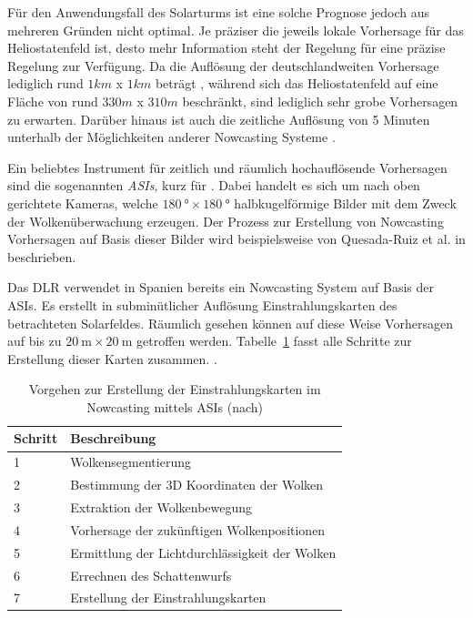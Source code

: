 Für den Anwendungsfall des Solarturms ist eine solche Prognose jedoch aus mehreren Gründen nicht optimal.
Je präziser die jeweils lokale Vorhersage für das Heliostatenfeld ist, desto mehr Information steht der Regelung für eine präzise Regelung zur Verfügung.
Da die Auflösung der deutschlandweiten Vorhersage lediglich rund $1km$ x $1km$ beträgt \cite{DWD1}\cite{DWD2}, während sich das Heliostatenfeld auf eine Fläche von rund $330m$ x $310m$ beschränkt, sind lediglich sehr grobe Vorhersagen zu erwarten.
Darüber hinaus ist auch die zeitliche Auflösung von 5 Minuten \cite{DWD2} unterhalb der Möglichkeiten anderer Nowcasting Systeme \cite{DLRNowcasting}\cite[S.272]{QuesadaRuiz}.

Ein beliebtes Instrument für zeitlich und räumlich hochauflösende Vorhersagen sind die sogenannten \textit{ASIs}, kurz für .
Dabei handelt es sich um nach oben gerichtete Kameras, welche $\SI{180}{\degree} \times \SI{180}{\degree}$ halbkugelförmige Bilder mit dem Zweck der Wolkenüberwachung erzeugen.
Der Prozess zur Erstellung von Nowcasting Vorhersagen auf Basis dieser Bilder wird beispielsweise von Quesada-Ruiz et al. in \cite{QuesadaRuiz} beschrieben. \cite{Samu}

Das DLR verwendet in Spanien bereits ein Nowcasting System auf Basis der ASIs.
Es erstellt in subminütlicher Auflösung Einstrahlungskarten des betrachteten Solarfeldes.
Räumlich gesehen können auf diese Weise Vorhersagen auf bis zu $\SI{20}{\metre} \times \SI{20}{\metre}$ getroffen werden.
Tabelle~\ref{tab_VorgehenNowcasting} fasst alle Schritte zur Erstellung dieser Karten zusammen. \cite[S.4,S.13]{Samu}\cite{DLRNowcasting}.

\begin{table}[ht!]
    \caption[Vorgehen zur Erstellung der Einstrahlungskarten im Nowcasting mittels ASIs]{Vorgehen zur Erstellung der Einstrahlungskarten im Nowcasting mittels ASIs (nach\cite[S.4]{Samu})}
    \centering
    \begin{tabular}{m{}m{}}
        \rowcolor{white}
        Schritt & Beschreibung                                   \\
        \midrule
        1       & Wolkensegmentierung                            \\
        2       & Bestimmung der 3D Koordinaten der Wolken       \\
        3       & Extraktion der Wolkenbewegung                  \\
        4       & Vorhersage der zukünftigen Wolkenpositionen    \\
        5       & Ermittlung der Lichtdurchlässigkeit der Wolken \\
        6       & Errechnen des Schattenwurfs                    \\
        7       & Erstellung der Einstrahlungskarten             \\
    \end{tabular}
    \label{tab_VorgehenNowcasting}
\end{table}

